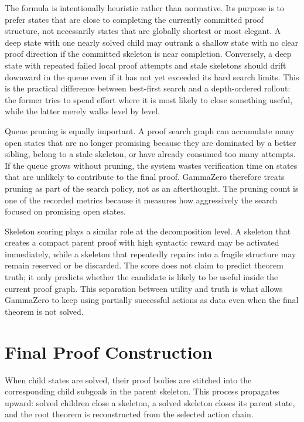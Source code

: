 The formula is intentionally heuristic rather than normative. Its purpose is to prefer states that are
close to completing the currently committed proof structure, not necessarily states that are globally
shortest or most elegant. A deep state with one nearly solved child may outrank a shallow state with no
clear proof direction if the committed skeleton is near completion. Conversely, a deep state with repeated
failed local proof attempts and stale skeletons should drift downward in the queue even if it has not yet exceeded its
hard search limits. This is the practical difference between best-first search and a depth-ordered rollout:
the former tries to spend effort where it is most likely to close something useful, while the latter merely
walks level by level.

Queue pruning is equally important. A proof search graph can accumulate many open states that are no
longer promising because they are dominated by a better sibling, belong to a stale skeleton, or have
already consumed too many attempts. If the queue grows without pruning, the system wastes verification
time on states that are unlikely to contribute to the final proof. GammaZero therefore treats pruning as
part of the search policy, not as an afterthought. The pruning count is one of the recorded metrics
because it measures how aggressively the search focused on promising open states.

Skeleton scoring plays a similar role at the decomposition level. A skeleton that creates a compact parent proof with high syntactic reward may be activated immediately, while a skeleton that repeatedly repairs into a
fragile structure may remain reserved or be discarded. The score does not claim to predict theorem
truth; it only predicts whether the candidate is likely to be useful inside the current proof graph. This
separation between utility and truth is what allows GammaZero to keep using partially successful actions
as data even when the final theorem is not solved.

\section{Final Proof Construction}

When child states are solved, their proof bodies are stitched into the corresponding child subgoals in the parent skeleton. This process propagates upward: solved children close a skeleton, a solved skeleton closes its parent state, and the root theorem is reconstructed from the selected action chain.

